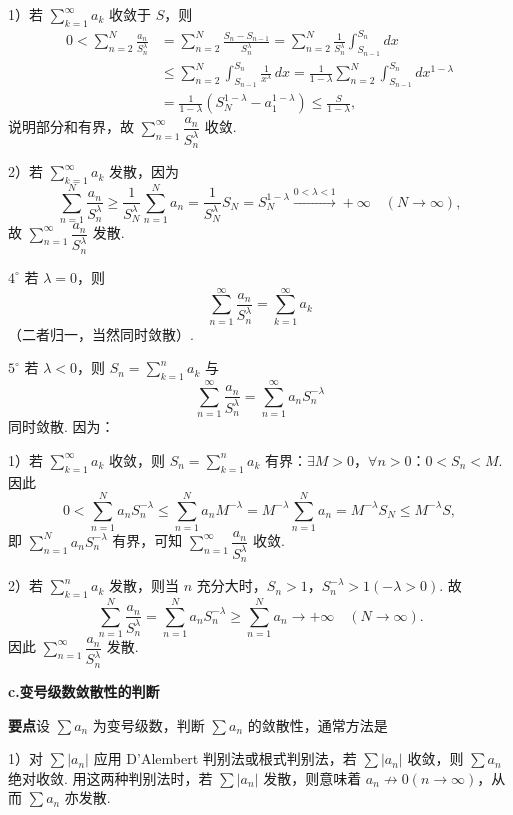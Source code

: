 \documentclass[UTF8, 12pt, fontset=fandol, oneside]{ctexart}
\begin{document}
1）若 $\displaystyle\sum_{k=1}^\infty a_k$ 收敛于 $S$，则
\[
\begin{aligned}
0<\sum_{n=2}^N\frac{a_n}{S_n^\lambda}
&=\sum_{n=2}^N\frac{S_n-S_{n-1}}{S_n^\lambda}
=\sum_{n=2}^N\frac1{S_n^\lambda}\int_{S_{n-1}}^{S_n}dx\\
&\le\sum_{n=2}^N\int_{S_{n-1}}^{S_n}\frac1{x^\lambda}\,dx
=\frac1{1-\lambda}\sum_{n=2}^N\int_{S_{n-1}}^{S_n}dx^{1-\lambda}\\
&=\frac1{1-\lambda}(S_N^{1-\lambda}-a_1^{1-\lambda})
\le\frac{S}{1-\lambda},
\end{aligned}
\]
说明部分和有界，故 $\displaystyle\sum_{n=1}^\infty\dfrac{a_n}{S_n^\lambda}$ 收敛.

2）若 $\displaystyle\sum_{k=1}^\infty a_k$ 发散，因为
\[
  \sum_{n=1}^N\frac{a_n}{S_n^\lambda}
  \ge\frac1{S_N^\lambda}\sum_{n=1}^N a_n
  =\frac1{S_N^\lambda}S_N
  =S_N^{1-\lambda}\stackrel{0<\lambda<1}{\longrightarrow}+\infty\quad(N\to\infty),
\]
故 $\displaystyle\sum_{n=1}^\infty\dfrac{a_n}{S_n^\lambda}$ 发散.

$4^\circ$ 若 $\lambda=0$，则
\[
  \sum_{n=1}^\infty\frac{a_n}{S_n^\lambda}
  =\sum_{k=1}^\infty a_k
\]
（二者归一，当然同时敛散）.

$5^\circ$ 若 $\lambda<0$，则 $S_n=\displaystyle\sum_{k=1}^n a_k$ 与
\[
  \sum_{n=1}^\infty\frac{a_n}{S_n^\lambda}
  =\sum_{n=1}^\infty a_nS_n^{-\lambda}
\]
同时敛散. 因为：

1）若 $\displaystyle\sum_{k=1}^\infty a_k$ 收敛，则 $S_n=\displaystyle\sum_{k=1}^n a_k$ 有界：$\exists M>0$，$\forall n>0$：$0<S_n<M$. 因此
\[
  0<\sum_{n=1}^N a_nS_n^{-\lambda}
  \le\sum_{n=1}^N a_nM^{-\lambda}
  =M^{-\lambda}\sum_{n=1}^N a_n
  =M^{-\lambda}S_N\le M^{-\lambda}S,
\]
即 $\displaystyle\sum_{n=1}^N a_nS_n^{-\lambda}$ 有界，可知 $\displaystyle\sum_{n=1}^\infty\dfrac{a_n}{S_n^\lambda}$ 收敛.

2）若 $\displaystyle\sum_{k=1}^n a_k$ 发散，则当 $n$ 充分大时，$S_n>1$，$S_n^{-\lambda}>1(-\lambda>0)$. 故
\[
  \sum_{n=1}^N\frac{a_n}{S_n^\lambda}
  =\sum_{n=1}^N a_nS_n^{-\lambda}
  \ge\sum_{n=1}^N a_n\to+\infty\quad(N\to\infty).
\]
因此 $\displaystyle\sum_{n=1}^\infty\dfrac{a_n}{S_n^\lambda}$ 发散.

\noindent\textbf{c.\quad 变号级数敛散性的判断}

\noindent\textbf{要点}\quad 设 $\sum a_n$ 为变号级数，判断 $\sum a_n$ 的敛散性，通常方法是

1）对 $\sum |a_n|$ 应用 D'Alembert 判别法或根式判别法，若 $\sum |a_n|$ 收敛，则 $\sum a_n$ 绝对收敛. 用这两种判别法时，若 $\sum |a_n|$ 发散，则意味着 $a_n\not\to0(n\to\infty)$，从而 $\sum a_n$ 亦发散.
\end{document}
